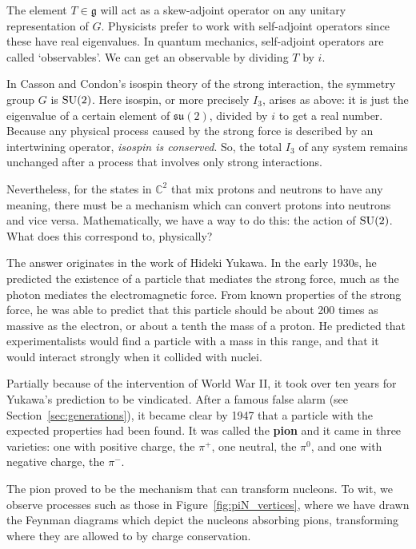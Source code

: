 \documentclass{article}
\newcommand{\C}{{\mathbb C}}  %
\newcommand{\SU}{{\rm SU}}    %
\newcommand{\su}{{\mathfrak{su}}}  %
\newcommand{\g}{{\mathfrak{g}}}  %
\begin{document}
The element $T \in \g$ will act as a skew-adjoint operator on any
unitary representation of $G$.  Physicists prefer to work with 
self-adjoint operators since these have real eigenvalues.  
In quantum mechanics, self-adjoint operators are called `observables'.  
We can get an observable by dividing $T$ by $i$.  

In Casson and Condon's isospin theory of the strong interaction, the symmetry
group $G$ is $\SU(2)$.  Here isospin, or more precisely $I_3$, arises
as above: it is just the eigenvalue of a certain element of $\su(2)$,
divided by $i$ to get a real number.  Because any physical process 
caused by the strong force is described by an intertwining operator, 
\emph{isospin is conserved}.  So, the total $I_3$ of any system 
remains unchanged after a process that involves only strong interactions.

Nevertheless, for the states in $\C^2$ that mix protons and neutrons to have
any meaning, there must be a mechanism which can convert protons into neutrons
and vice versa. Mathematically, we have a way to do this: the action of
$\SU(2)$.  What does this correspond to, physically?

The answer originates in the work of Hideki Yukawa. In the early 1930s, he
predicted the existence of a particle that mediates the strong force,
much as the photon mediates the electromagnetic force.  From known 
properties of the strong force, he was able to predict that this particle
should be about 200 times as massive as the electron,
or about a tenth the mass of a proton. He predicted that experimentalists would
find a particle with a mass in this range, and that it would interact strongly
when it collided with nuclei.

Partially because of the intervention of World War II, it took over
ten years for Yukawa's prediction to be vindicated.  After a 
famous false alarm (see Section~\ref{sec:generations}), 
it became clear by 1947 that a particle with the
expected properties had been found. It was called the \textbf{pion} and
it came in three varieties: one with positive charge, the $\pi^+$, one
neutral, the $\pi^0$, and one with negative charge, the $\pi^-$.

The pion proved to be the mechanism that can transform nucleons. To wit, we
observe processes such as those in Figure~\ref{fig:piN_vertices}, where we have
drawn the Feynman diagrams which depict the nucleons absorbing pions,
transforming where they are allowed to by charge conservation.
\end{document}

